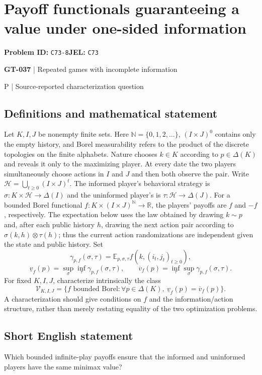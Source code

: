 \documentclass[11pt,a4paper]{article}
\newcommand{\N}{\mathbb N}
\begin{document}
\section*{Payoff functionals guaranteeing a value under one-sided information}
\textbf{Problem ID:} \texttt{C73-8}\quad \textbf{JEL:} \texttt{C73}\par
\label{problem:OP-0167}
\label{game:GT-037}
{\sffamily\small\color{muted}
{\sffamily\small\color{muted}\textbf{GT-037} | Repeated games with incomplete information\par P | Source-reported characterization question\par}
\par}
\subsection*{Definitions and mathematical statement}
Let $K,I,J$ be nonempty finite sets. Here $\N=\{0,1,2,\ldots\}$, $(I\times J)^0$ contains only the empty history, and Borel measurability refers to the product of the discrete topologies on the finite alphabets. Nature chooses $k\in K$ according to $p\in\Delta(K)$ and reveals it only to the maximizing player. At every date the two players simultaneously choose actions in $I$ and $J$ and then both observe the pair. Write $\mathcal H=\bigcup_{t\geq0}(I\times J)^t$. The informed player's behavioral strategy is $\sigma:K\times\mathcal H\to\Delta(I)$ and the uninformed player's is $\tau:\mathcal H\to\Delta(J)$. For a bounded Borel functional $f:K\times(I\times J)^{\mathbb N}\to\mathbb R$, the players' payoffs are $f$ and $-f$, respectively. The expectation below uses the law obtained by drawing $k\sim p$ and, after each public history $h$, drawing the next action pair according to $\sigma(k,h)\otimes\tau(h)$; thus the current action randomizations are independent given the state and public history. Set
\[
 \gamma_{p,f}(\sigma,\tau)=\mathbb E_{p,\sigma,\tau}f(k,(i_t,j_t)_{t\geq0}),
\]
\[
 \underline v_f(p)=\sup_\sigma\inf_\tau\gamma_{p,f}(\sigma,\tau),
 \qquad
 \overline v_f(p)=\inf_\tau\sup_\sigma\gamma_{p,f}(\sigma,\tau).
\]
For fixed $K,I,J$, characterize intrinsically the class
\[
 \mathcal V_{K,I,J}=\{f\text{ bounded Borel}:
 \forall p\in\Delta(K),\ \underline v_f(p)=\overline v_f(p)\}.
\]
A characterization should give conditions on $f$ and the information/action structure, rather than merely restating equality of the two optimization problems.
\subsection*{Short English statement}
Which bounded infinite-play payoffs ensure that the informed and uninformed players have the same minimax value?
\end{document}
